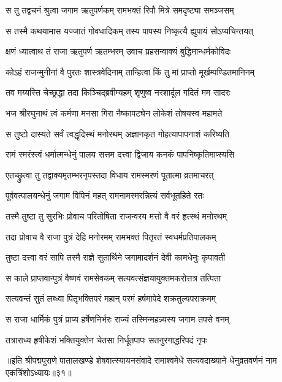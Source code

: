 \twolineshloka
{स तु तद्वचनं श्रुत्वा जगाम ऋतुपर्णकम्}
{रामभक्तं रिपौ मित्रे समदृष्ट्या समञ्जसम्}%

\twolineshloka
{स तस्मै कथयामास यज्जातं गोवधादिकम्}
{तस्य पापस्य निष्कृत्यै ह्युपायं सोऽप्यचिन्तयत्}%

\twolineshloka
{क्षणं ध्यात्वाथ तं राजा ऋतुपर्ण ऋतम्भरम्}
{उवाच प्रहसन्वाक्यं बुद्धिमान्धर्मकोविदः}%

\twolineshloka
{कोऽहं राजन्मुनीनां वै पुरतः शास्त्रवेदिनाम्}
{तान्हित्वा किं तु मां प्राप्तो मूर्खम्पण्डितमानिनम्}%

\twolineshloka
{तव मय्यस्ति चेच्छ्रद्धा तदा किञ्चिद्ब्रवीम्यहम्}
{शृणुष्व नरशार्दूल गदितं मम सादरः}%

\twolineshloka
{भज श्रीरघुनाथं त्वं कर्मणा मनसा गिरा}
{नैष्कापट्येन लोकेशं तोषयस्व महामते}%

\twolineshloka
{स तुष्टो दास्यते सर्वं त्वद्धृदिस्थं मनोरथम्}
{अज्ञानकृत गोहत्यापापनाशं करिष्यति}%

\twolineshloka
{रामं स्मरंस्त्वं धर्मात्मन्धेनुं पालय सत्तम}
{दत्त्वा द्विजाय कनकं पापनिष्कृतिमाप्स्यसि}%


\twolineshloka
{एतच्छ्रुत्वा तु तद्वाक्यमृतम्भरनृपस्तदा}
{विधाय रामस्मरणं पूतात्मा व्रतमाचरत्}%

\twolineshloka
{पूर्ववत्पालयन्धेनुं जगाम विपिनं महत्}
{रामनामस्मरन्नित्यं सर्वभूतहिते रतः}%

\twolineshloka
{तस्मै तुष्टा तु सुरभिः प्रोवाच परितोषिता}
{राजन्वरय मत्तो वै वरं हृत्स्थं मनोरथम्}%

\twolineshloka
{तदा प्रोवाच वै राजा पुत्रं देहि मनोरमम्}
{रामभक्तं पितृरतं स्वधर्मप्रतिपालकम्}%

\twolineshloka
{तुष्टा दत्त्वा वरं सापि तस्मै राज्ञे सुतार्थिने}
{जगामादर्शनं देवी कामधेनुः कृपावती}%

\twolineshloka
{स काले प्राप्तवान्पुत्रं वैष्णवं रामसेवकम्}
{सत्यवत्संज्ञयायुक्तमकरोत्तत्र तत्पिता}%

\twolineshloka
{सत्यवन्तं सुतं लब्ध्वा पितृभक्तिपरं महान्}
{परमं हर्षमापेदे शक्रतुल्यपराक्रमम्}%

\twolineshloka
{स राजा धार्मिकं पुत्रं प्राप्य हर्षेणनिर्भरः}
{राज्यं तस्मिन्महन्न्यस्य जगाम तपसे वनम्}%

\twolineshloka
{तत्राराध्य हृषीकेशं भक्तियुक्तेन चेतसा}
{निर्धूतपापः सतनुरगाद्धरिपदं नृपः}%

{॥इति श्रीपद्मपुराणे पातालखण्डे शेषवात्स्यायनसंवादे रामाश्वमेधे सत्यवदाख्याने धेनुव्रतवर्णनं नाम एकत्रिंशोऽध्यायः॥३१॥}

